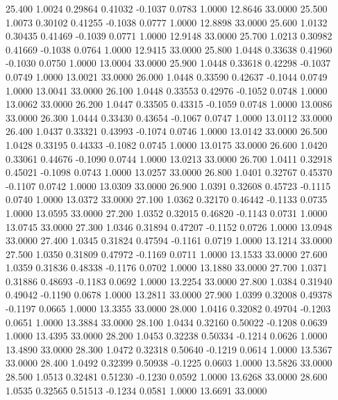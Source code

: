   25.400   1.0024   0.29864   0.41032  -0.1037   0.0783   1.0000  12.8646  33.0000
  25.500   1.0073   0.30102   0.41255  -0.1038   0.0777   1.0000  12.8898  33.0000
  25.600   1.0132   0.30435   0.41469  -0.1039   0.0771   1.0000  12.9148  33.0000
  25.700   1.0213   0.30982   0.41669  -0.1038   0.0764   1.0000  12.9415  33.0000
  25.800   1.0448   0.33638   0.41960  -0.1030   0.0750   1.0000  13.0004  33.0000
  25.900   1.0448   0.33618   0.42298  -0.1037   0.0749   1.0000  13.0021  33.0000
  26.000   1.0448   0.33590   0.42637  -0.1044   0.0749   1.0000  13.0041  33.0000
  26.100   1.0448   0.33553   0.42976  -0.1052   0.0748   1.0000  13.0062  33.0000
  26.200   1.0447   0.33505   0.43315  -0.1059   0.0748   1.0000  13.0086  33.0000
  26.300   1.0444   0.33430   0.43654  -0.1067   0.0747   1.0000  13.0112  33.0000
  26.400   1.0437   0.33321   0.43993  -0.1074   0.0746   1.0000  13.0142  33.0000
  26.500   1.0428   0.33195   0.44333  -0.1082   0.0745   1.0000  13.0175  33.0000
  26.600   1.0420   0.33061   0.44676  -0.1090   0.0744   1.0000  13.0213  33.0000
  26.700   1.0411   0.32918   0.45021  -0.1098   0.0743   1.0000  13.0257  33.0000
  26.800   1.0401   0.32767   0.45370  -0.1107   0.0742   1.0000  13.0309  33.0000
  26.900   1.0391   0.32608   0.45723  -0.1115   0.0740   1.0000  13.0372  33.0000
  27.100   1.0362   0.32170   0.46442  -0.1133   0.0735   1.0000  13.0595  33.0000
  27.200   1.0352   0.32015   0.46820  -0.1143   0.0731   1.0000  13.0745  33.0000
  27.300   1.0346   0.31894   0.47207  -0.1152   0.0726   1.0000  13.0948  33.0000
  27.400   1.0345   0.31824   0.47594  -0.1161   0.0719   1.0000  13.1214  33.0000
  27.500   1.0350   0.31809   0.47972  -0.1169   0.0711   1.0000  13.1533  33.0000
  27.600   1.0359   0.31836   0.48338  -0.1176   0.0702   1.0000  13.1880  33.0000
  27.700   1.0371   0.31886   0.48693  -0.1183   0.0692   1.0000  13.2254  33.0000
  27.800   1.0384   0.31940   0.49042  -0.1190   0.0678   1.0000  13.2811  33.0000
  27.900   1.0399   0.32008   0.49378  -0.1197   0.0665   1.0000  13.3355  33.0000
  28.000   1.0416   0.32082   0.49704  -0.1203   0.0651   1.0000  13.3884  33.0000
  28.100   1.0434   0.32160   0.50022  -0.1208   0.0639   1.0000  13.4395  33.0000
  28.200   1.0453   0.32238   0.50334  -0.1214   0.0626   1.0000  13.4890  33.0000
  28.300   1.0472   0.32318   0.50640  -0.1219   0.0614   1.0000  13.5367  33.0000
  28.400   1.0492   0.32399   0.50938  -0.1225   0.0603   1.0000  13.5826  33.0000
  28.500   1.0513   0.32481   0.51230  -0.1230   0.0592   1.0000  13.6268  33.0000
  28.600   1.0535   0.32565   0.51513  -0.1234   0.0581   1.0000  13.6691  33.0000
